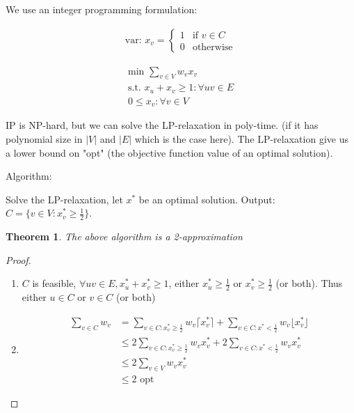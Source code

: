 \documentclass{article}
\theoremstyle{plain}
\newtheorem{thm}{Theorem}
\theoremstyle{definition}
\newcommand{\floor}[1]{\lfloor #1 \rfloor}
\newcommand{\ceiling}[1]{\lceil #1 \rceil}
\begin{document}
We use an integer programming formulation:

\begin{align*}
    \text{var: } x_v = \begin{cases}
        1 & \text{if } v\in C\\
        0 & \text{otherwise}
    \end{cases}
\end{align*}

\begin{gather*}
    \text{min } \sum_{v\in V} w_v x_v\\
    \text{s.t. } x_u + x_v \geq 1: \forall uv\in E\\
    0 \leq x_v: \forall v\in V
\end{gather*}

IP is NP-hard, but we can solve the LP-relaxation in poly-time. (if it has polynomial
size in $|V|$ and $|E|$ which is the case here). The LP-relaxation give us a
lower bound on "opt" (the objective function value of an optimal solution).

Algorithm:
\begin{algorithmic}[1]
    \State Solve the LP-relaxation, let $x^*$ be an optimal solution.
    \State Output: $C=\{v\in V: x_v^*\geq \frac{1}{2}\}$.
\end{algorithmic}

\begin{thm}
    The above algorithm is a 2-approximation
\end{thm}

\begin{proof}
   \begin{enumerate}
       \item $C$ is feasible, $\forall uv\in E, x_u^* + x_v^*\geq 1$, either
           $x^*_u\geq \frac{1}{2}$ or $x^*_v\geq\frac{1}{2}$ (or both).
           Thus either $u\in C$ or $v\in C$ (or both)
       \item
           \begin{align*}
               \sum_{v\in C}w_v &= \sum_{v\in C: x^*_v\geq\frac{1}{2}}w_v\ceiling{x_v^*} +
               \sum_{v\in C: x^*<\frac{1}{2}} w_v\floor{x^*_v}\\
               &\leq 2\sum_{v\in C: x^*_v\geq\frac{1}{2}}w_vx_v^* +
               2\sum_{v\in C: x^*<\frac{1}{2}} w_vx^*_v\\
               &\leq 2\sum_{v\in V}w_vx^*_v\\
               &\leq 2\text{ opt}
           \end{align*}
   \end{enumerate}
\end{proof}
\end{document}
